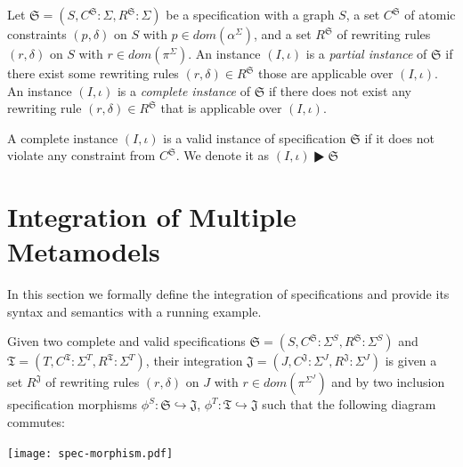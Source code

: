 \documentclass{eceasst}
\begin{document}
\begin{definition}
 Let $\mathfrak{S} = (S, C^{\mathfrak{S}}:\Sigma, R^{\mathfrak{S}}:\Sigma )$ be a specification with 
 a graph $S$, 
 a set $C^\mathfrak{S}$ of atomic constraints $(p, \delta)$ on $S$ with $p \in dom(\alpha^\Sigma)$, and
 a set $R^\mathfrak{S}$ of rewriting rules $(r, \delta)$ on $S$ with $r \in dom(\pi^\Sigma)$. 
 An instance $(I, \iota)$ is a \textit{partial instance} of $\mathfrak{S}$ if there exist some rewriting rules $(r, \delta) \in R^{\mathfrak{S}}$ those are applicable over $(I, \iota)$. 
 An instance $(I, \iota)$ is a \textit{complete instance} of $\mathfrak{S}$ if there does not exist any rewriting rule $(r, \delta) \in R^{\mathfrak{S}}$ that is applicable over $(I, \iota)$. 

\end{definition}


\begin{remark}
A complete instance $(I, \iota)$ is a valid instance of specification $\mathfrak{S}$ if it does not violate any constraint from $C^{\mathfrak{S}}$. We denote it as $(I, \iota) \RHD \mathfrak{S}$
\end{remark}


\section{Integration of Multiple Metamodels}\label{lbl:integration}
In this section we formally define the integration of specifications and provide its syntax and semantics with a running example. 

\begin{definition}
 Given two complete and valid specifications $\mathfrak{S} = (S, C^{\mathfrak{S}}: \Sigma^S, R^{\mathfrak{S}}: \Sigma^S)$ and 
 $\mathfrak{T} = (T, C^{\mathfrak{T}}: \Sigma^T, R^{\mathfrak{T}}: \Sigma^T)$, 
 their integration $\mathfrak{J} = (J, C^{\mathfrak{J}}: \Sigma^J, R^{\mathfrak{J}}:\Sigma^J)$ is given 
 a set $R^{\mathfrak{J}}$ of rewriting rules $(r,\delta)$ on $J$ with $r \in dom(\pi^{\Sigma^J})$ and
 by two inclusion specification morphisms $\phi^S : \mathfrak{S} \hookrightarrow \mathfrak{J}$, $\phi^T : \mathfrak{T} \hookrightarrow \mathfrak{J}$ 
 such that the following diagram commutes:
  
\begin{center}
\texttt{[image: spec-morphism.pdf]}
\end{center}  
 
\end{definition}
\end{document}
